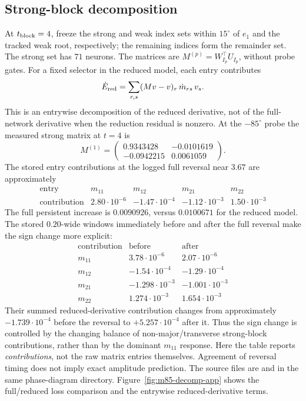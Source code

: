 \documentclass[10pt]{article}
\theoremstyle{remark}\newtheorem{remark}[theorem]{Remark}
\begin{document}
\subsection{Strong-block decomposition}
At $t_{\rm block}=4$, freeze the strong and weak index sets within
$15^\circ$ of $e_1$ and the tracked weak root, respectively; the remaining
indices form the remainder set. The strong set has $71$ neurons.
The matrices are $M^{(p)}=W_{I_p}^\top U_{I_p}$, without probe gates.
For a fixed selector in the reduced model, each entry contributes
\begin{equation}\label{eq:empirical-entry}
 \dot E_{\rm red}=\sum_{r,s}(M v-v)_r\,\dot m_{rs}\,v_s.
\end{equation}
This is an entrywise decomposition of the reduced derivative, not of
the full-network derivative when the reduction residual is nonzero.
At the $-85^\circ$ probe the measured strong matrix at $t=4$ is
\[
 M^{(1)}=\begin{pmatrix}
 0.9343428&-0.0101619\\-0.0942215&0.0061059
 \end{pmatrix}.
\]
The stored entry contributions at the logged full reversal near $3.67$
are approximately
\[
\begin{array}{c|rrrr}
\text{entry}&m_{11}&m_{12}&m_{21}&m_{22}\\\hline
\text{contribution}&2.80\cdot10^{-6}&-1.47\cdot10^{-4}&-1.12\cdot10^{-3}&1.50\cdot10^{-3}
\end{array}
\]
The full persistent increase is $0.0090926$, versus $0.0100671$ for the
reduced model. The stored $0.20$-wide windows immediately before and after
the full reversal make the sign change more explicit:
\[
\begin{array}{c|rr}
\text{contribution}&\text{before}&\text{after}\\\hline
m_{11}& 3.78\cdot10^{-6}& 2.07\cdot10^{-6}\\
m_{12}&-1.54\cdot10^{-4}&-1.29\cdot10^{-4}\\
m_{21}&-1.298\cdot10^{-3}&-1.001\cdot10^{-3}\\
m_{22}& 1.274\cdot10^{-3}& 1.654\cdot10^{-3}
\end{array}
\]
Their summed reduced-derivative contribution changes from approximately
$-1.739\cdot10^{-4}$ before the reversal to
$+5.257\cdot10^{-4}$ after it. Thus the sign change is controlled by the
changing balance of non-major/transverse strong-block contributions, rather
than by the dominant $m_{11}$ response. Here the table reports
\emph{contributions}, not the raw matrix entries themselves.
Agreement of reversal timing does not imply exact amplitude prediction.
The source files are  and
 in the same phase-diagram directory.
Figure~\ref{fig:m85-decomp-app} shows the full/reduced loss comparison and
the entrywise reduced-derivative terms.
\end{document}
